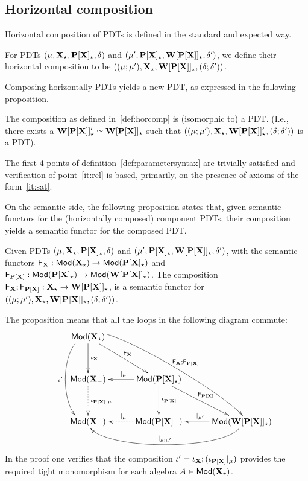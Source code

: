 \subsection{Horizontal composition}\label{sec:semfunccomp}\label{sub:hcsyn}
Horizontal composition of PDTs is defined in the standard and expected way.
\begin{definition}\label{def:horcomp}
For PDTs %
$\pdtsp{\mu}{\delta}{\thr{X_\cons}}{\thr{P[X]_\cons}}$ and
$\pdtsp{\mu'}{\delta'}{\thr{P[X]_\cons}}{\thr{W[P[X]]_\cons}}$,
we define their horizontal composition to be $\pdtsp{(\mu;\mu')}{(\delta;\delta')}{\thr
X_\cons}{\thr{W[P[X]]_\cons}}$. 
\end{definition}
%
Composing horizontally PDTs yields a new PDT, as expressed in the following proposition.
\begin{proposition}\label{prop:horcomp}
The composition as defined in~\ref{def:horcomp} is (isomorphic to) a
PDT. (I.e., there exists a $\thr{W[P[X]]'_\cons}\iso\thr{W[P[X]]_\cons}$
such that $\pdtsp{(\mu;\mu')}{(\delta;\delta')}{\thr
X_\cons}{\thr{W[P[X]]'_\cons}}$ is a PDT).
\end{proposition}
The first 4 points of definition~\ref{def:parametersyntax} are trivially
satisfied and verification of point~\ref{it:rel} is based, primarily, on the 
presence of axioms of the form~\ref{it:sat}.

On the semantic side,
the following proposition states that, given semantic functors for the (horizontally composed)
component PDTs, their composition yields a semantic functor for the composed
PDT. 
\begin{proposition}
Given PDTs $\pdt$ and
$\pdtsp{\mu'}{\delta'}{\thr{P[X]_\cons}}{\thr{W[P[X]]_\cons}}$, 
with the semantic functors
$\fu{F_\thr{X}}: \Mod(\thr{X_\cons}) \to 
\Mod(\thr{P[X]_\cons})$ and $\fu{F_\thr{P[X]}}: \Mod(\thr{P[X]_\cons}) \to
\Mod(\thr{W[P[X]]_\cons})$. The composition
$\comp{\fu{F_\thr{X}}}{\fu{F_\thr{P[X]}}}:\thr{X_\cons} \to
\thr{W[P[X]]_\cons}$, is a semantic functor for
$\pdtsp{(\mu;\mu')}{(\delta;\delta')}{\thr{X_\cons}}{\thr{W[P[X]]_\cons}}$. 
\end{proposition}
The proposition means that all the loops in the following diagram commute:
\[
\xymatrix@C=0.4cm@R=0.5cm{
&& \Mod(\thr{X_\cons}) \ar[dd]^{\iota_{\thr{X}}}
\ar@(l,l)[dddd]_{\iota'} \ar[rrdd]^{\fu{F_\thr{X}}}
\ar@(u,r)[rrrrdddd]^{\comp{\fu{F_\thr{X}}}{\fu{F_\thr{P[X]}}}}\\ 
\\
&& \Mod(\thr{X_{\weak}}) \ar@{.>}[dd]^{\iota_{\thr{P[X]}}|_\mu}
&& \Mod(\thr{P[X]_\cons}) \ar[ll]_{|_{\mu}} \ar[dd]^{\iota_{\thr{P[X]}}} \ar[rrdd]^{\fu{F_\thr{P[X]}}}\\
\\
&&\Mod(\thr{X_{\weak}})
&& \Mod(\thr{P[X]_{\weak}}) \ar@{.>}[ll]_{|_{\mu}}
&& \Mod(\thr{W[P[X]]_\cons}) \ar[ll]_{|_{\mu'}} \ar@(d,d)[llll]_{|_{\comp{\mu}{\mu'}}}\\
\\
}
\]
In the proof one verifies that the composition
$\iota'=\iota_{\thr{X}};(\iota_{\thr{P[X]}}|_\mu)$ provides the required tight
monomorphism for each algebra $A\in\Mod(\thr{X_\cons})$.

